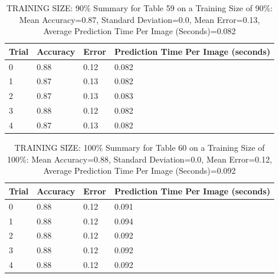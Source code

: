 \documentclass{article}
\begin{document}
\begin{table}[H]

\centering
{\begin{tabular}{||p{1cm}|p{1.8cm}|p{1.8cm}|p{3cm}||}
 \hline
Trial & Accuracy & Error & Prediction Time Per Image (seconds) \\ [0.5ex] 
 \hline\hline
   0  & 0.88  & 0.12  & 0.082\\
\hline
   1  & 0.87  & 0.13  & 0.082\\
\hline
   2  & 0.87  & 0.13  & 0.083\\
\hline
   3  & 0.88  & 0.12  & 0.082\\
\hline
   4  & 0.87  & 0.13  & 0.082\\
\hline


\end{tabular}}
\caption{TRAINING SIZE: 90\% \newline Summary for Table 59 on a Training Size of 90\%: Mean Accuracy=0.87, Standard Deviation=0.0, Mean Error=0.13, Average Prediction Time Per Image (Seconds)=0.082}
\end{table} 

\begin{table}[H]

\centering
{\begin{tabular}{||p{1cm}|p{1.8cm}|p{1.8cm}|p{3cm}||}
 \hline
Trial & Accuracy & Error & Prediction Time Per Image (seconds) \\ [0.5ex] 
 \hline\hline
   0  & 0.88  & 0.12  & 0.091\\
\hline
   1  & 0.88  & 0.12  & 0.094\\
\hline
   2  & 0.88  & 0.12  & 0.092\\
\hline
   3  & 0.88  & 0.12  & 0.092\\
\hline
   4  & 0.88  & 0.12  & 0.092\\
\hline


\end{tabular}}
\caption{TRAINING SIZE: 100\% \newline Summary for Table 60 on a Training Size of 100\%: Mean Accuracy=0.88, Standard Deviation=0.0, Mean Error=0.12, Average Prediction Time Per Image (Seconds)=0.092}
\end{table} 



\end{document}
